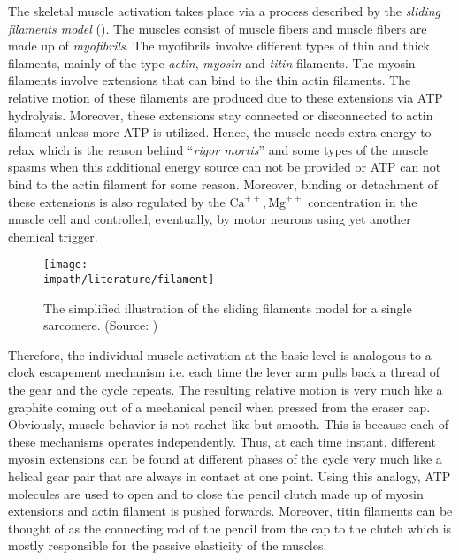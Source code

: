 The skeletal muscle activation takes place via a process described by the \emph{sliding filaments model} (). 
The muscles consist of muscle fibers and muscle fibers are made up of \emph{myofibrils}. The myofibrils involve different types of thin 
and thick filaments, mainly of the type \emph{actin}, \emph{myosin} and \emph{titin} filaments. The myosin filaments involve 
extensions that can bind to the thin actin filaments. The relative motion of these filaments are produced due to these 
extensions via ATP hydrolysis. Moreover, these extensions stay connected or disconnected to actin filament unless more 
ATP is utilized. Hence, the muscle needs extra energy to relax which is the reason behind \enquote{\emph{rigor mortis}} 
and some types of the muscle spasms when this additional energy source can not be provided or ATP can not bind to the 
actin filament for some reason. Moreover, binding or detachment of these extensions is also regulated by the 
$\mathrm{Ca}^{++},\mathrm{Mg}^{++}$ concentration in the muscle cell and controlled, eventually, by motor neurons using yet another 
chemical trigger. 

\begin{figure}%
\centering
\texttt{[image: \\impath/literature/filament]}%
\caption[The simplified illustration of the sliding filaments model for a single sarcomere.]%
{The simplified illustration of the sliding filaments model for a single sarcomere. (Source: \cite{ottenheijm})}%
\label{fig:lit:filament}%
\end{figure}


Therefore, the individual muscle activation at the basic level is analogous to a clock escapement mechanism \cite{headrick} 
i.e. each time the lever arm pulls back a thread of the gear and the cycle repeats. The resulting relative motion is very much 
like a graphite coming out of a mechanical pencil when pressed from the eraser cap. Obviously, muscle behavior is not rachet-like 
but smooth. This is because each of these mechanisms operates independently. Thus, at each time instant, different myosin extensions 
can be found at different phases of the cycle very much like a helical gear pair that are always in contact at one point. 
Using this analogy, ATP molecules are used to open and to close the pencil clutch made up of myosin extensions and actin filament 
is pushed forwards. Moreover, titin filaments can be thought of as the connecting rod of the pencil from the cap to the clutch which 
is mostly responsible for the passive elasticity of the muscles. 

